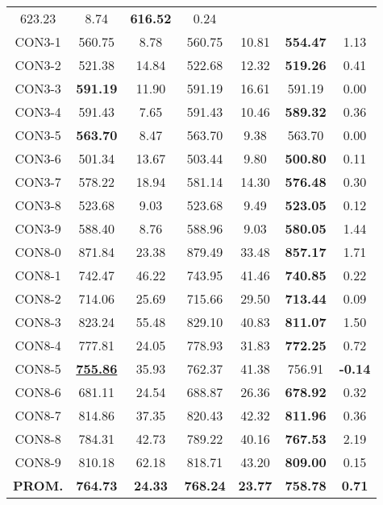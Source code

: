 \begin{table}[ht]
\begin{tabular}{c c c c c c c}
623.23 & 8.74 & \bf{616.52} & 
0.24\\CON3-1 & 560.75 & 8.78 & 
560.75 & 10.81 & \bf{554.47} & 
1.13\\CON3-2 & 521.38 & 14.84 & 
522.68 & 12.32 & \bf{519.26} & 
0.41\\CON3-3 & \bf{591.19} & 11.90 & 
591.19 & 16.61 & 591.19 & 0.00\\
CON3-4 & 591.43 & 7.65 & 
591.43 & 10.46 & \bf{589.32} & 
0.36\\CON3-5 & \bf{563.70} & 8.47 & 
563.70 & 9.38 & 563.70 & 0.00\\
CON3-6 & 501.34 & 13.67 & 
503.44 & 9.80 & \bf{500.80} & 
0.11\\CON3-7 & 578.22 & 18.94 & 
581.14 & 14.30 & \bf{576.48} & 
0.30\\CON3-8 & 523.68 & 9.03 & 
523.68 & 9.49 & \bf{523.05} & 
0.12\\CON3-9 & 588.40 & 8.76 & 
588.96 & 9.03 & \bf{580.05} & 
1.44\\CON8-0 & 871.84 & 23.38 & 
879.49 & 33.48 & \bf{857.17} & 
1.71\\CON8-1 & 742.47 & 46.22 & 
743.95 & 41.46 & \bf{740.85} & 
0.22\\CON8-2 & 714.06 & 25.69 & 
715.66 & 29.50 & \bf{713.44} & 
0.09\\CON8-3 & 823.24 & 55.48 & 
829.10 & 40.83 & \bf{811.07} & 
1.50\\CON8-4 & 777.81 & 24.05 & 
778.93 & 31.83 & \bf{772.25} & 
0.72\\CON8-5 & \bf{\underline{755.86}} & 35.93 & 
762.37 & 41.38 & 756.91 & 
\bf{-0.14}\\CON8-6 & 681.11 & 24.54 & 
688.87 & 26.36 & \bf{678.92} & 
0.32\\CON8-7 & 814.86 & 37.35 & 
820.43 & 42.32 & \bf{811.96} & 
0.36\\CON8-8 & 784.31 & 42.73 & 
789.22 & 40.16 & \bf{767.53} & 
2.19\\CON8-9 & 810.18 & 62.18 & 
818.71 & 43.20 & \bf{809.00} & 
0.15\\\bf{PROM.} & 
\bf{764.73} & \bf{24.33} & \bf{768.24} & \bf{23.77} & \bf{758.78} & \bf{0.71}\\[1ex]\hline
\end{tabular}
\label{table:nonlin}
\end{table} \clearpage
